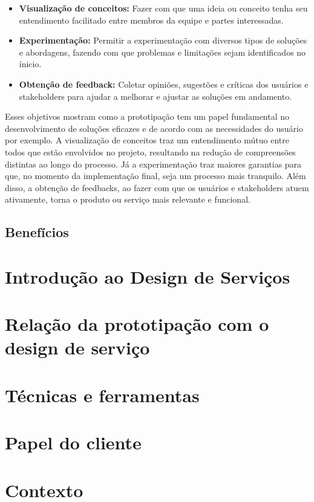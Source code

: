 \begin{itemize}
	\item \textbf{Visualização de conceitos:} Fazer com que uma ideia ou conceito tenha seu entendimento facilitado entre membros da equipe e partes interessadas.
	
	\item \textbf{Experimentação:} Permitir a experimentação com diversos tipos de soluções e abordagens, fazendo com que problemas e limitações sejam identificados no ínicio.
	
	\item \textbf{Obtenção de feedback:} Coletar opiniões, sugestões e críticas dos usuários e stakeholders para ajudar a melhorar e ajustar as soluções em andamento.
\end{itemize}

Esses objetivos mostram como a prototipação tem um papel fundamental no desenvolvimento de soluções eficazes e de acordo com as necessidades do usuário por exemplo. A visualização de conceitos traz um entendimento mútuo entre todos que estão envolvidos no projeto, resultando na redução de compreensões distintas ao longo do processo. Já a experimentação traz maiores garantias para que, no momento da implementação final, seja um processo mais tranquilo. Além disso, a obtenção de feedbacks, ao fazer com que os usuários e stakeholders atuem ativamente, torna o produto ou serviço mais relevante e funcional.

\subsection{Benefícios}

\section{Introdução ao Design de Serviços}

\section{Relação da prototipação com o design de serviço}


\section{Técnicas e ferramentas}

\section{Papel do cliente}

\section{Contexto}

